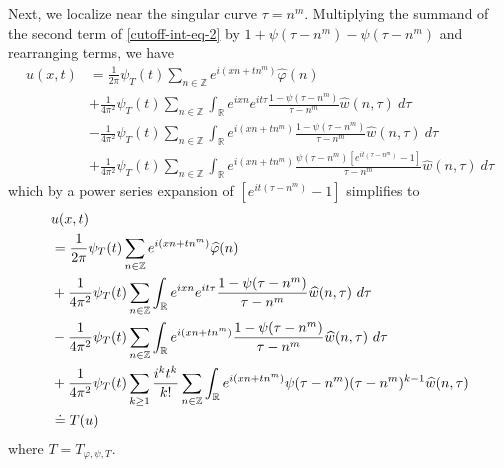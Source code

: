 \documentclass[12pt,reqno]{amsart}
\numberwithin{equation}{section}  %
\numberwithin{figure}{section}
\newcommand{\rr}{\mathbb{R}}
\newcommand{\zz}{\mathbb{Z}}
\newcommand{\wh}{\widehat}
\newcommand{\vp}{\varphi}
\theoremstyle{plain}
\theoremstyle{definition}
\theoremstyle{remark}
\begin{document}
%
%
%
Next, we localize near the singular curve $\tau =  n^m$.  Multiplying the
summand of the second term of \eqref{cutoff-int-eq-2} by $1 + \psi(\tau -
n^m) - \psi(\tau -
n^m) $ and
rearranging terms, we have
%
%
\begin{equation*}
	\begin{split}
		 u(x, t)
		& = \frac{1}{2 \pi} \psi_{T}(t) \sum_{n \in \zz} e^{i(xn + t n^{m 
		})} \widehat{\vp}(n) 
		\\
		& + \frac{1}{4 \pi^2} \psi_{T}(t) \sum_{n \in \zz} \int_\rr e^{ixn}  
		e^{it \tau} \frac{ 1 - \psi(\tau - n^m) 
		}{\tau - n^m} \wh{w}(n, \tau) \ d \tau
		\\
		& - \frac{1}{4 \pi^2} \psi_{T}(t) \sum_{n \in \zz} \int _\rr e^{i(xn + 
		t n^m)}
		 \frac{1- \psi(\tau - n^m)}{\tau - n^m} \wh{w}(n, \tau) \ d \tau
		\\
		& + \frac{1}{4 \pi^2} \psi_{T}(t) \sum_{n \in \zz} \int_\rr
		e^{i(xn + t n^m)}
		\frac{\psi(\tau - n^m)\left[ e^{it(\tau - n^m)}-1 
		\right]}{\tau - n^m} \wh{w}(n, \tau) \ d \tau
	\end{split}
\end{equation*}
%
%
which by a power series expansion of $[e^{it(\tau - n^m)}-1]$ simplifies  
to
%
%
\begin{align}
	\label{main-int-expression-0}
	& u(x, t) 
		\\
		\label{main-int-expression-1}
		& = \frac{1}{2 \pi} \psi_{T}(t) \sum_{n \in \zz} e^{i(xn + tn^{m 
		})} \widehat{\vp}(n) 
		\\
		\label{main-int-expression-2}
		& + \frac{1}{4 \pi^2} \psi_{T}(t) \sum_{n\in \zz} \int_\rr e^{ixn}  
		e^{it \tau} \frac{ 1 - \psi(\tau -  n^m) 
		}{\tau -  n^m} \wh{w}(n, \tau) \ d \tau
		\\
		\label{main-int-expression-3}
		& - \frac{1}{4 \pi^2} \psi_{T}(t) \sum_{n\in \zz} \int_\rr e^{i(xn + 
		t n^m)}
		 \frac{1- \psi(\tau -  n^m)}{\tau -  n^m} \wh{w}(n, \tau) \ d \tau
		\\
		\label{main-int-expression-4}
		& + \frac{1}{4 \pi^2} \psi_{T}(t) \sum_{k \ge 1} \frac{i^k t^k}{k!}
		\sum_{n \in \zz} \int_\rr e^{i(xn + t n^m )}
		\psi(\tau -  n^m) (\tau -  n^m)^{k-1} \wh{w}(n, \tau)  
		\\
		& \doteq T(u) \notag
\end{align}
%
%
where $T = T_{\vp, \psi, T}$. 
\end{document}
